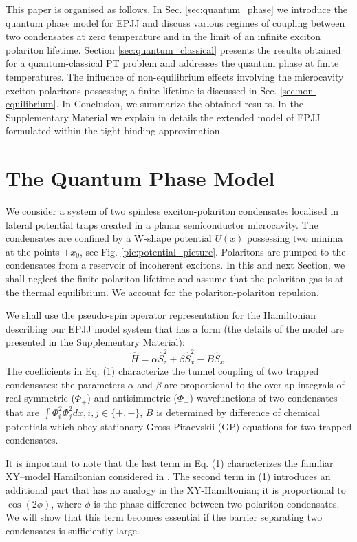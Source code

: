 \documentclass[aps, pre, preprint, groupedaddress, superscriptaddress, showkeys, showpacs] {revtex4-1}
\begin{document}
This paper is organised as follows.
In Sec. \ref{sec:quantum_phase} we introduce the quantum phase model for EPJJ and discuss various regimes of coupling between two condensates at zero temperature and in the limit of an infinite exciton polariton lifetime.
Section \ref{sec:quantum_classical} presents the results obtained for a quantum-classical PT problem and addresses the quantum phase at finite temperatures.
The influence of non-equilibrium effects involving the microcavity exciton polaritons possessing a finite lifetime is discussed in Sec. \ref{sec:non-equilibrium}.      
In Conclusion, we summarize the obtained results.
In the Supplementary Material we explain in details the extended model of EPJJ formulated within the tight-binding approximation.
 
\section{The Quantum Phase Model \label{sec:quantum_phase}}

We consider a system of two spinless exciton-polariton condensates localised in lateral potential traps created in a planar semiconductor microcavity.
The condensates are confined by a W-shape potential $U(x)$ possessing two minima at the points $\pm x_0$, see Fig. \ref{pic:potential_picture}.
Polaritons are pumped to the condensates from a reservoir of incoherent excitons. In this and next Section, we shall neglect the finite polariton lifetime and assume that the polariton gas is at the thermal equilibrium.   
We account for the polariton-polariton repulsion.

We shall use the pseudo-spin operator representation for the Hamiltonian describing our EPJJ model system that has a form (the details of the model are presented in the Supplementary Material): 
%
\begin{equation}
\hat{H} = \alpha \hat{S}_z^2 + \beta \hat{S}_x^2 - B \hat{S}_x.
\label{eq:hamiltonian_spin}
\end{equation}
%
The coefficients in Eq. (1) characterize the tunnel coupling of two trapped condensates:
the parameters $\alpha$ and $\beta$ are proportional to the overlap integrals of real symmetric ($\Phi_+$) and antisimmetric ($\Phi_-$) wavefunctions of two condensates that are
$\int \Phi_i^2 \Phi_j^2 dx, i,j \in \{+,-\}$, $B$ is determined by difference of chemical potentials which obey stationary Gross-Pitaevskii (GP) equations for two trapped condensates.

It is important to note that the last term in Eq. (1) characterizes the familiar XY--model Hamiltonian  considered in
\cite{Lago1, Lago2}.
The second term in (1) introduces an additional part that has no analogy in the XY-Hamiltonian; it is proportional to $\cos(2\phi)$, where $\phi$ is the phase difference between two polariton condensates.
We will show that this term becomes essential if the barrier separating two condensates is sufficiently large.
\end{document}
